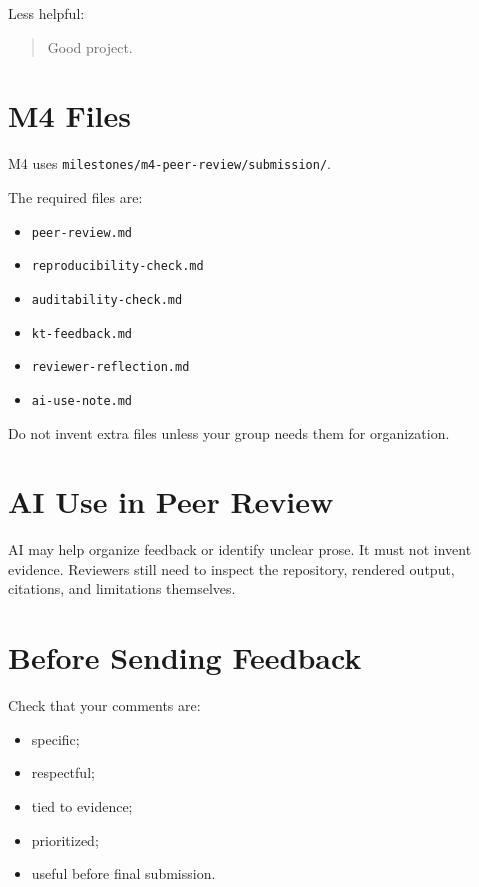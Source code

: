 \documentclass[
  letterpaper,
  DIV=11,
  numbers=noendperiod,
  oneside]{scrreprt}
\providecommand{\tightlist}{%
  \setlength{\itemsep}{0pt}\setlength{\parskip}{0pt}}
\begin{document}
Less helpful:

\begin{quote}
Good project.
\end{quote}

\section*{M4 Files}\label{m4-files}


M4 uses \texttt{milestones/m4-peer-review/submission/}.

The required files are:

\begin{itemize}
\tightlist
\item
  \texttt{peer-review.md}
\item
  \texttt{reproducibility-check.md}
\item
  \texttt{auditability-check.md}
\item
  \texttt{kt-feedback.md}
\item
  \texttt{reviewer-reflection.md}
\item
  \texttt{ai-use-note.md}
\end{itemize}

Do not invent extra files unless your group needs them for organization.

\section*{AI Use in Peer Review}\label{ai-use-in-peer-review}


AI may help organize feedback or identify unclear prose. It must not
invent evidence. Reviewers still need to inspect the repository,
rendered output, citations, and limitations themselves.

\section*{Before Sending Feedback}\label{before-sending-feedback}


Check that your comments are:

\begin{itemize}
\tightlist
\item
  specific;
\item
  respectful;
\item
  tied to evidence;
\item
  prioritized;
\item
  useful before final submission.
\end{itemize}
\end{document}
